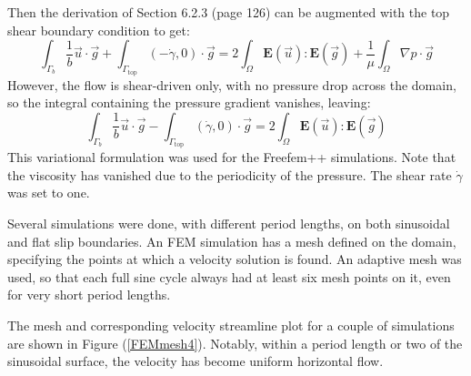 \documentclass[12pt, a4paper, twoside, openright]{book}
\begin{document}
Then the derivation of Section 6.2.3 (page 126) can be augmented with the top shear boundary condition to get:
\begin{equation}
\int_{\Gamma_b} \frac{1}{b} \vec{u} \cdot \vec{g} +
\int_{\Gamma_{\mathrm{top}}} (-\dot{\gamma},0) \cdot \vec{g} = 
2 \int_{\Omega} \mathbf{E}(\vec{u}) : \mathbf{E}(\vec{g}) +
\frac{1}{\mu} \int_{\Omega}  \nabla p \cdot \vec{g}
\end{equation}
However, the flow is shear-driven only, with no pressure drop across the domain, so the integral containing the pressure gradient vanishes, leaving:
\begin{equation}
\int_{\Gamma_b} \frac{1}{b} \vec{u} \cdot \vec{g} -
\int_{\Gamma_{\mathrm{top}}} (\dot{\gamma},0) \cdot \vec{g} = 
2 \int_{\Omega} \mathbf{E}(\vec{u}) : \mathbf{E}(\vec{g})
\end{equation}
This variational formulation was used for the Freefem++ simulations.  Note that the viscosity has vanished due to the periodicity of the pressure.  The shear rate $\dot{\gamma}$ was set to one.

Several simulations were done, with different period lengths, on both sinusoidal and flat slip boundaries.  An FEM simulation has a mesh defined on the domain, specifying the points at which a velocity solution is found.  An adaptive mesh was used, so that each full sine cycle always had at least six mesh points on it, even for very short period lengths.

The mesh and corresponding velocity streamline plot for a couple of simulations are shown in Figure (\ref{FEMmesh4}).  Notably, within a period length or two of the sinusoidal surface, the velocity has become uniform horizontal flow.
\end{document}
